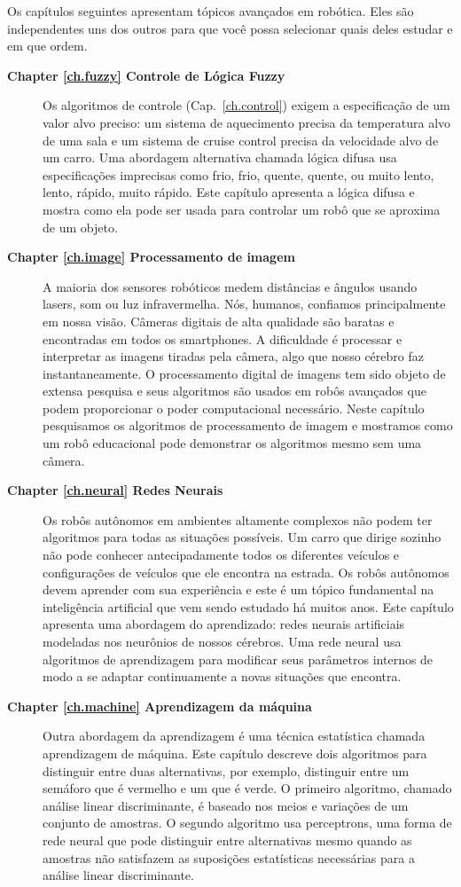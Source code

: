 Os capítulos seguintes apresentam tópicos avançados em robótica. Eles são independentes uns dos outros para que você possa selecionar quais deles estudar e em que ordem.
\begin{description}
\item [\textbf{Chapter \ref{ch.fuzzy} Controle de Lógica Fuzzy}] Os algoritmos de controle (Cap.~\ref{ch.control}) exigem a especificação de um valor alvo preciso: um sistema de aquecimento precisa da temperatura alvo de uma sala e um sistema de cruise control precisa da velocidade alvo de um carro. Uma abordagem alternativa chamada lógica difusa usa especificações imprecisas como frio, frio, quente, quente, ou muito lento, lento, rápido, muito rápido. Este capítulo apresenta a lógica difusa e mostra como ela pode ser usada para controlar um robô que se aproxima de um objeto.

\item [\textbf{Chapter \ref{ch.image} Processamento de imagem}] A maioria dos sensores robóticos medem distâncias e ângulos usando lasers, som ou luz infravermelha. Nós, humanos, confiamos principalmente em nossa visão. Câmeras digitais de alta qualidade são baratas e encontradas em todos os smartphones. A dificuldade é processar e interpretar as imagens tiradas pela câmera, algo que nosso cérebro faz instantaneamente. O processamento digital de imagens tem sido objeto de extensa pesquisa e seus algoritmos são usados em robôs avançados que podem proporcionar o poder computacional necessário. Neste capítulo pesquisamos os algoritmos de processamento de imagem e mostramos como um robô educacional pode demonstrar os algoritmos mesmo sem uma câmera.

\item [\textbf{Chapter \ref{ch.neural} Redes Neurais}] Os robôs autônomos em ambientes altamente complexos não podem ter algoritmos para todas as situações possíveis. Um carro que dirige sozinho não pode conhecer antecipadamente todos os diferentes veículos e configurações de veículos que ele encontra na estrada. Os robôs autônomos devem aprender com sua experiência e este é um tópico fundamental na inteligência artificial que vem sendo estudado há muitos anos. Este capítulo apresenta uma abordagem do aprendizado: redes neurais artificiais modeladas nos neurônios de nossos cérebros. Uma rede neural usa algoritmos de aprendizagem para modificar seus parâmetros internos de modo a se adaptar continuamente a novas situações que encontra.

\item [\textbf{Chapter \ref{ch.machine} Aprendizagem da máquina}] Outra abordagem da aprendizagem é uma técnica estatística chamada aprendizagem de máquina. Este capítulo descreve dois algoritmos para distinguir entre duas alternativas, por exemplo, distinguir entre um semáforo que é vermelho e um que é verde. O primeiro algoritmo, chamado análise linear discriminante, é baseado nos meios e variações de um conjunto de amostras. O segundo algoritmo usa perceptrons, uma forma de rede neural que pode distinguir entre alternativas mesmo quando as amostras não satisfazem as suposições estatísticas necessárias para a análise linear discriminante.


\end{description}
